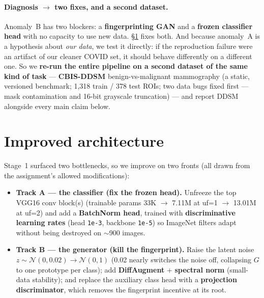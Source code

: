 \documentclass[11pt]{article}
\newcommand{\code}[1]{\texttt{#1}}
\begin{document}
\paragraph{Diagnosis $\rightarrow$ two fixes, and a second dataset.} Anomaly~B has two
blockers: a \textbf{fingerprinting GAN} and a \textbf{frozen classifier head} with no
capacity to use new data. §\ref{sec:improvedarch} fixes both. And because anomaly~A is
a hypothesis about \emph{our data}, we test it directly: if the reproduction failure
were an artifact of our cleaner COVID set, it should behave differently on a different
one. So we \textbf{re-run the entire pipeline on a second dataset of the same kind of
task} --- \textbf{CBIS-DDSM} benign-vs-malignant mammography (a static, versioned
benchmark; 1{,}318 train / 378 test ROIs; two data bugs fixed first --- mask
contamination and 16-bit grayscale truncation) --- and report DDSM alongside every
main claim below.

\section{Improved architecture}
\label{sec:improvedarch}
Stage~1 surfaced two bottlenecks, so we improve on two fronts (all drawn from the
assignment's allowed modifications):

\begin{itemize}[nosep,leftmargin=1.4em]
  \item \textbf{Track A --- the classifier (fix the frozen head).} Unfreeze the top
        VGG16 conv block(s) (trainable params 33K $\to$ 7.11M at uf=1 $\to$ 13.01M at
        uf=2) and add a \textbf{BatchNorm head}, trained with \textbf{discriminative
        learning rates} (head \code{1e-3}, backbone \code{1e-5}) so ImageNet filters
        adapt without being destroyed on $\sim$900 images.
  \item \textbf{Track B --- the generator (kill the fingerprint).} Raise the latent
        noise $z\sim\mathcal{N}(0,0.02)\to\mathcal{N}(0,1)$ (0.02 nearly switches the
        noise off, collapsing $G$ to one prototype per class); add \textbf{DiffAugment}
        + \textbf{spectral norm} (small-data stability); and replace the auxiliary
        class head with a \textbf{projection discriminator}, which removes the
        fingerprint incentive at its root.
\end{itemize}
\end{document}
